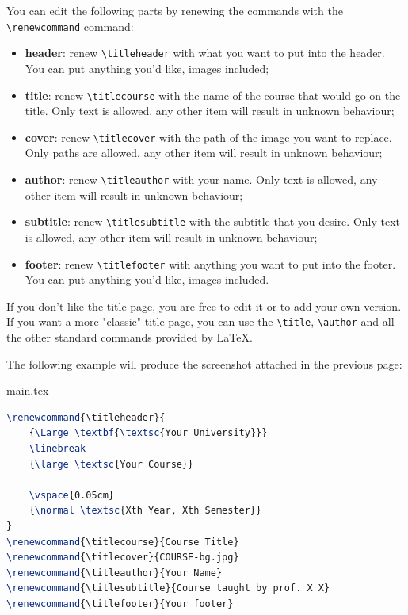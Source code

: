 \documentclass[]{notex}
\begin{document}
You can edit the following parts by renewing the commands with the \verb|\renewcommand| command:
\begin{itemize}
    \item \textbf{header}: renew \verb|\titleheader| with what you want to put into the header. You can put anything you'd like, images included;
    \item \textbf{title}: renew \verb|\titlecourse| with the name of the course that would go on the title. Only text is allowed, any other item will result in unknown behaviour;
    \item \textbf{cover}: renew \verb|\titlecover| with the path of the image you want to replace. Only paths are allowed, any other item will result in unknown behaviour;
    \item \textbf{author}: renew \verb|\titleauthor| with your name. Only text is allowed, any other item will result in unknown behaviour;
    \item \textbf{subtitle}: renew \verb|\titlesubtitle| with the subtitle that you desire. Only text is allowed, any other item will result in unknown behaviour;
    \item \textbf{footer}: renew \verb|\titlefooter| with anything you want to put into the footer. You can put anything you'd like, images included.
\end{itemize}

If you don't like the title page, you are free to edit it or to add your own version. If you want a more "classic" title page, you can use the \verb|\title|, \verb|\author| and all the other standard commands provided by \LaTeX.

\begin{example}
    The following example will produce the screenshot attached in the previous page:

    \begin{codeblock}{main.tex}
        \begin{lstlisting}[language = tex]
\renewcommand{\titleheader}{
    {\Large \textbf{\textsc{Your University}}}
    \linebreak
    {\large \textsc{Your Course}}

    \vspace{0.05cm}
    {\normal \textsc{Xth Year, Xth Semester}}
}
\renewcommand{\titlecourse}{Course Title}
\renewcommand{\titlecover}{COURSE-bg.jpg}
\renewcommand{\titleauthor}{Your Name}
\renewcommand{\titlesubtitle}{Course taught by prof. X X}
\renewcommand{\titlefooter}{Your footer}\end{lstlisting}
    \end{codeblock}
\end{example}
\end{document}
